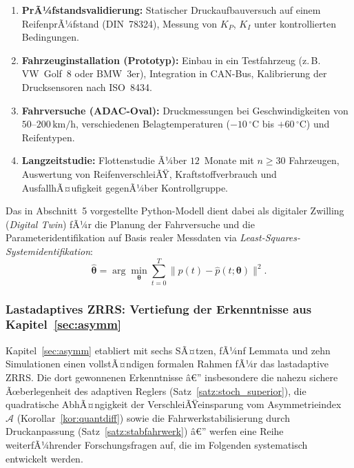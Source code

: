 ﻿\documentclass[a4paper,12pt]{article}
\theoremstyle{definition}
\begin{document}
\begin{enumerate}
    \item \textbf{PrÃ¼fstandsvalidierung:} Statischer Druckaufbauversuch
    auf einem ReifenprÃ¼fstand (DIN~78324), Messung von $K_P$, $K_I$ unter
    kontrollierten Bedingungen.
    \item \textbf{Fahrzeuginstallation (Prototyp):} Einbau in ein Testfahrzeug
    (z.\,B. VW~Golf~8 oder BMW~3er), Integration in CAN-Bus, Kalibrierung
    der Drucksensoren nach ISO~8434.
    \item \textbf{Fahrversuche (ADAC-Oval):} Druckmessungen bei Geschwindigkeiten
    von $50$--$200\,\text{km/h}$, verschiedenen Belagtemperaturen
    ($-10\,^\circ\mathrm{C}$ bis $+60\,^\circ\mathrm{C}$) und Reifentypen.
    \item \textbf{Langzeitstudie:} Flottenstudie Ã¼ber $12$~Monate mit
    $n \geq 30$ Fahrzeugen, Auswertung von ReifenverschleiÃŸ, Kraftstoff\-verbrauch
    und AusfallhÃ¤ufigkeit gegenÃ¼ber Kontrollgruppe.
\end{enumerate}

Das in Abschnitt~5 vorgestellte Python-Modell dient dabei als digitaler Zwilling
(\emph{Digital Twin}) fÃ¼r die Planung der Fahrversuche und die
Parameteridentifikation auf Basis realer Messdaten via
\emph{Least-Squares-Systemidentifikation}:
\[
    \hat{\boldsymbol{\theta}} = \arg\min_{\boldsymbol{\theta}}
    \sum_{t=0}^{T} \bigl\|p(t) - \hat{p}(t; \boldsymbol{\theta})\bigr\|^2.
\]

\subsubsection{Lastadaptives ZRRS: Vertiefung der Erkenntnisse aus Kapitel~\ref{sec:asymm}}
\label{sec:ausblick_asymm}

Kapitel~\ref{sec:asymm} etabliert mit sechs SÃ¤tzen, fÃ¼nf Lemmata und zehn
Simulationen einen vollstÃ¤ndigen formalen Rahmen fÃ¼r das lastadaptive ZRRS.
Die dort gewonnenen Erkenntnisse â€” insbesondere die nahezu sichere Ãœberlegenheit
des adaptiven Reglers (Satz~\ref{satz:stoch_superior}), die quadratische
AbhÃ¤ngigkeit der VerschleiÃŸeinsparung vom Asymmetrieindex $\mathcal{A}$
(Korollar~\ref{kor:quantdiff}) sowie die Fahrwerkstabilisierung durch
Druckanpassung (Satz~\ref{satz:stabfahrwerk}) â€” werfen eine Reihe weiterfÃ¼hrender
Forschungsfragen auf, die im Folgenden systematisch entwickelt werden.
\end{document}
